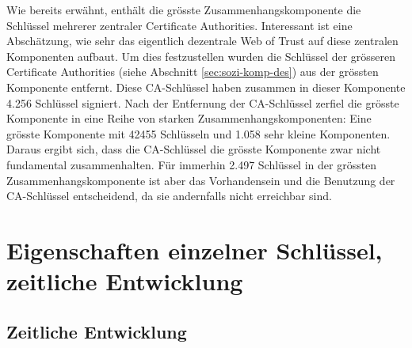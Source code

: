 Wie bereits erw\"ahnt, enth\"alt die gr\"osste Zusammenhangskomponente
die Schl\"ussel mehrerer zentraler Certificate
Authorities. Interessant ist eine Absch\"atzung, wie sehr das
eigentlich dezentrale Web of Trust auf diese zentralen Komponenten
aufbaut. Um dies festzustellen wurden die Schl\"ussel der gr\"osseren
Certificate Authorities (siehe Abschnitt \ref{sec:sozi-komp-des}) aus
der gr\"ossten Komponente entfernt. Diese CA-Schl\"ussel haben
zusammen in dieser Komponente 4.256 Schl\"ussel signiert. Nach der
Entfernung der CA-Schl\"ussel zerfiel die gr\"osste Komponente in eine
Reihe von starken Zusammenhangskomponenten: Eine gr\"osste Komponente
mit 42455 Schl\"usseln und 1.058 sehr kleine Komponenten. Daraus ergibt
sich, dass die CA-Schl\"ussel die gr\"osste Komponente zwar nicht
fundamental zusammenhalten. F\"ur immerhin 2.497 Schl\"ussel in der
gr\"ossten Zusammenhangskomponente ist aber das Vorhandensein und die
Benutzung der CA-Schl\"ussel entscheidend, da sie andernfalls nicht
erreichbar sind.

\section{Eigenschaften einzelner Schl\"ussel, zeitliche Entwicklung}
\label{sec:result-key-properties}

\subsection{Zeitliche Entwicklung}
\label{sec:zeitl-entw}

